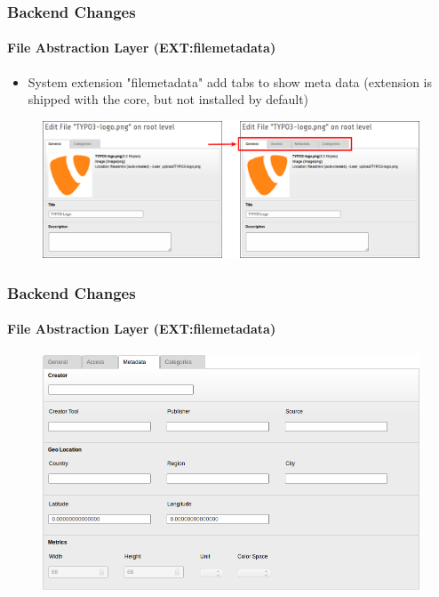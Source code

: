 
\begin{frame}[fragile]
	\frametitle{Backend Changes}
	\framesubtitle{File Abstraction Layer (EXT:filemetadata)}

	\begin{itemize}
		\item System extension "filemetadata" add tabs to show meta data\newline
			\small(extension is shipped with the core, but not installed by default)\normalsize
	\end{itemize}

	\begin{figure}
		\includegraphics[width=0.95\linewidth]{Images/BackendChanges/FileMetaDataTabs.png}
	\end{figure}

\end{frame}


\begin{frame}[fragile]
	\frametitle{Backend Changes}
	\framesubtitle{File Abstraction Layer (EXT:filemetadata)}

	\begin{figure}
		\includegraphics[width=0.8\linewidth]{Images/BackendChanges/FileMetaData.png}
	\end{figure}

\end{frame}

